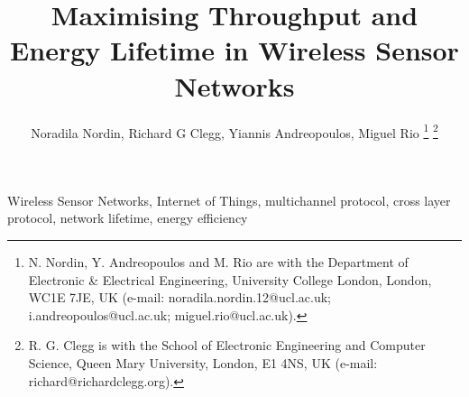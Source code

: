 \documentclass[journal]{IEEEtran}
\begin{document}
\title{Maximising Throughput and Energy Lifetime in Wireless Sensor Networks}

\author{Noradila Nordin,
        Richard G Clegg,
        Yiannis Andreopoulos,
        Miguel Rio%
\thanks{N. Nordin, Y. Andreopoulos and M. Rio are with the Department
of Electronic \& Electrical Engineering, University College London, London,
WC1E 7JE, UK (e-mail: noradila.nordin.12@ucl.ac.uk; i.andreopoulos@ucl.ac.uk; miguel.rio@ucl.ac.uk).}%
\thanks{R. G. Clegg is with the School of Electronic Engineering and Computer Science, Queen Mary University, London, E1 4NS, UK (e-mail: richard@richardclegg.org).}%
}



\maketitle




\begin{IEEEkeywords}
Wireless Sensor Networks, Internet of Things, multichannel protocol, cross layer protocol, network lifetime, energy efficiency
\end{IEEEkeywords}

\IEEEpeerreviewmaketitle




%




%




\label{references}


\end{document}

